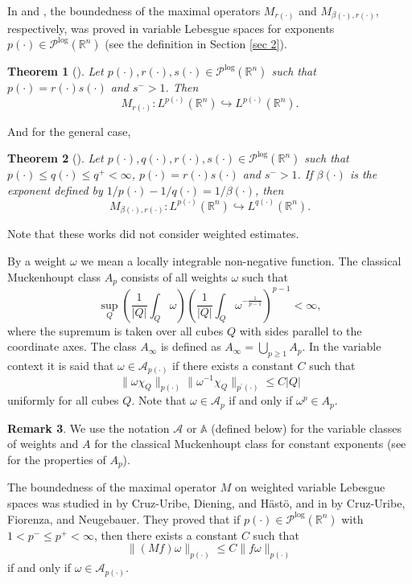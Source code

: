 \documentclass[a4paper,11pt,reqno]{amsart}
\theoremstyle{plain}
\numberwithin{equation}{section}
\newtheorem{teo}{Theorem}[section]
\theoremstyle{definition}
\newtheorem{remark}[teo]{Remark}
\newcommand{\R}{{\mathbb{R}^n}}
\begin{document}
In \cite{libro Diening} and \cite{Luciana Potential}, the boundedness of the maximal operators $M_{r(\cdot)}$ and $M_{\beta(\cdot),r(\cdot)}$, respectively, was proved in variable Lebesgue spaces for exponents $p(\cdot)\in\mathcal{P}^{\text{log}}(\R)$ (see the definition in Section \ref{sec 2}). 
\begin{teo}[\cite{libro Diening}]\label{acot Mr}
	Let $p(\cdot),r(\cdot),s(\cdot)\in\mathcal{P}^{\text{log}}(\R)$ such that $p(\cdot)=r(\cdot)s(\cdot)$ and $s^->1$. Then 
	$$M_{r(\cdot)}:L^{p(\cdot)}(\R)\hookrightarrow L^{p(\cdot)}(\R).$$
\end{teo}
And for the general case,
\begin{teo}[\cite{Luciana Potential}]\label{acot MBr}
	Let $p(\cdot),q(\cdot),r(\cdot),s(\cdot)\in\mathcal{P}^{\text{log}}(\R)$ such that ${p(\cdot)}\leq{q(\cdot)}\leq q^+<\infty$, ${p(\cdot)}={r(\cdot)}{s(\cdot)}$ and $s^->1$. If ${\beta(\cdot)}$ is the exponent defined by $1/p(\cdot)-1/q(\cdot)=1/\beta(\cdot)$, then
	$$M_{{\beta(\cdot)},{r(\cdot)}}:L^{p(\cdot)}(\R)\hookrightarrow L^{q(\cdot)}(\R).$$
\end{teo}
Note that these works did not consider weighted estimates. 

By a weight $\omega$ we mean a locally integrable non-negative function. The classical Muckenhoupt class $A_p$ consists of all weights $\omega$ such that
$$\sup_Q\left(\frac{1}{|Q|}\int_Q\omega\right)\left(\frac{1}{|Q|}\int_Q \omega^{-\frac{1}{p-1}}\right)^{p-1}<\infty,$$
where the supremum is taken over all cubes $Q$ with sides parallel to the coordinate axes. The class $A_\infty$ is defined as $A_\infty=\bigcup_{p\geq1}A_p$.
In the variable context it is said that $\omega\in \mathcal{A}_{p(\cdot)}$ if there exists a constant $C$ such that
\begin{equation*}
	\|\omega\chi_Q\|_{p(\cdot)}\|\omega^{-1}\chi_Q\|_{p^\prime(\cdot)}\leq C|Q|
\end{equation*}
uniformly for all cubes $Q$. Note that $\omega\in \mathcal{A}_p$ if and only if $\omega^p\in A_p$.
\begin{remark}
	We use the notation $\mathcal{A}$ or $\mathbb{A}$ (defined below) for the variable classes of weights and $A$ for the classical Muckenhoupt class for constant exponents (see \cite{pesos Apq constantes,pesos Ap constantes} for the properties of $A_p$).
\end{remark}

The boundedness of the maximal operator $M$ on weighted variable Lebesgue spaces was studied in \cite{C-U Diening Hasto} by Cruz-Uribe, Diening, and Hästö, and in \cite{C-U Fiorenza Neugebauer} by Cruz-Uribe, Fiorenza, and Neugebauer. They proved that if $p(\cdot)\in \mathcal{P}^{\text{log}}(\R)$ with $1<p^-\leq p^+<\infty$, then there exists a constant $C$ such that $$\|(Mf)\omega\|_{p(\cdot)}\leq C\|f\omega\|_{p(\cdot)}$$  
if and only if $\omega\in \mathcal{A}_{p(\cdot)}$.
\end{document}
